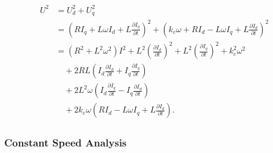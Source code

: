 \documentclass[12pt,a4paper,oneside,openany]{article}
\begin{document}
\begin{gather}
\begin{aligned}
U^2 &= U_d^2 + U_q^2 \\
	&= ( R I_q + L \omega I_d + L \frac{\partial I_q}{\partial t})^2 + ( k_e \omega + R I_d - L \omega I_q + L \frac{\partial I_d}{\partial t})^2 \\
	&= \left(R^2 + L^2 \omega^2 \right) I^2 + L^2 \left(\frac{\partial I_d}{\partial t}\right)^2 + L^2 \left(\frac{\partial I_q}{\partial t}\right)^2 + k_e^2 \omega^2\\
	&\quad + 2 R L \left( I_d \frac{\partial I_d}{\partial t} + I_q \frac{\partial I_q}{\partial t} \right) \\
	&\quad + 2 L^2 \omega \left(I_d \frac{\partial I_q}{\partial t} - I_q \frac{\partial I_d}{\partial t} \right) \\ 
	&\quad + 2 k_e \omega \left(R I_d - L \omega I_q + L \frac{\partial I_d}{\partial t} \right).
\end{aligned}
\end{gather}

\subsubsection{Constant Speed Analysis}
\end{document}
